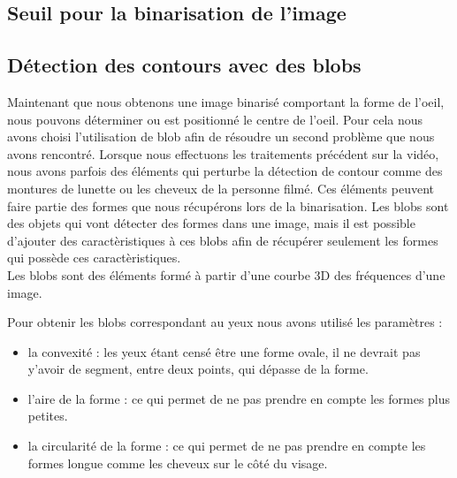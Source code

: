 \subsection{Seuil pour la binarisation de l'image}


\subsection{Détection des contours avec des blobs} %
Maintenant que nous obtenons une image binarisé comportant la forme de l'oeil, nous pouvons déterminer ou est
positionné le centre de l'oeil. Pour cela nous avons choisi l'utilisation de blob afin de résoudre un second 
problème que nous avons rencontré. Lorsque nous effectuons les traitements précédent sur la vidéo, nous avons
parfois des éléments qui perturbe la détection de contour comme des montures de lunette ou les cheveux de la personne 
filmé. Ces éléments peuvent faire partie des formes que nous récupérons lors de la binarisation. Les blobs
sont des objets qui vont détecter des formes dans une image, mais il est possible d'ajouter des caractèristiques
à ces blobs afin de récupérer seulement les formes qui possède ces caractèristiques.\\

Les blobs sont des éléments formé à partir d'une courbe 3D des fréquences d'une image.

Pour obtenir les blobs correspondant au yeux nous avons utilisé les paramètres :
\begin{itemize}
 \item la convexité : les yeux étant censé être une forme ovale, il ne devrait pas y'avoir de segment, entre 
 deux points, qui dépasse de la forme.
 \item l'aire de la forme : ce qui permet de ne pas prendre en compte les formes plus petites.
 \item la circularité de la forme : ce qui permet de ne pas prendre en compte les formes longue comme les cheveux
 sur le côté du visage.
\end{itemize}
